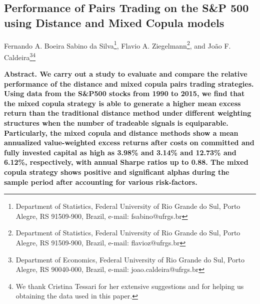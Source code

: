 \documentclass[a4paper,12pt]{report}
\begin{document}
\begin{refsection}
	\chapter{Performance of Pairs Trading on the S\&P 500 using Distance and Mixed Copula models}{} %
	\thispagestyle{myheadings}
	\markright{}
	
	
	
	\begin{center}\sc Fernando A. Boeira Sabino da Silva\footnote{Department of Statistics, Federal University of Rio Grande do Sul, Porto Alegre, RS 91509-900, Brazil, e-mail: fsabino@ufrgs.br}, Flavio A. Ziegelmann\footnote{Department of Statistics, Federal University of Rio Grande do Sul, Porto Alegre, RS 91509-900, Brazil, e-mail: flavioz@ufrgs.br}, and João F. Caldeira\footnote{Department of Economics, Federal University of Rio Grande do Sul, Porto Alegre, RS 90040-000, Brazil, e-mail: joao.caldeira@ufrgs.br}\footnote{We thank Cristina Tessari for her extensive suggestions and for helping us obtaining the data used in this paper.}\end{center}
	
	
	\setlength{\baselineskip}{12pt}
	\noindent\bf Abstract. \rm We carry out a study to evaluate and compare the relative performance of the distance and mixed copula pairs trading strategies. Using data from the S\&P500 stocks from 1990 to 2015, we find that the mixed copula strategy is able to generate a higher mean excess return than the traditional distance method under different weighting structures when the number of tradeable signals is equiparable. Particularly, the mixed copula and distance methods show a mean annualized value-weighted excess returns after costs on committed and fully invested capital as high as 3.98\% and 3.14\% and 12.73\% and 6.12\%, respectively, with annual Sharpe ratios up to 0.88. The mixed copula strategy shows positive and significant alphas during the sample period after accounting for various risk-factors.\\[.1in]
	

\end{refsection}
\end{document}

